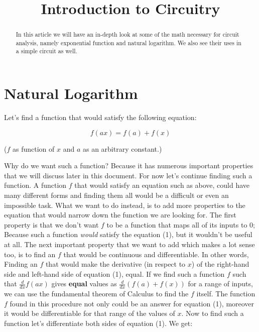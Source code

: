 \documentclass{article}
\begin{document}
	
	\title{Introduction to Circuitry}
	\author{}
	
	\maketitle
	
	\begin{abstract}
	In this article we will have an in-depth look at some of the math  necessary for circuit analysis, namely exponential function and natural logarithm. We also see their uses in a simple circuit as well.
	\end{abstract}
	
	\section{Natural Logarithm}
	Let's find a function that would satisfy the following equation:
	
	\begin{equation}
	\label{simple_equation}
	f(ax) = f(a) + f(x)
	\end{equation}
	
	($f$ as function of $x$ and $a$ as an arbitrary constant.)
	
	
	Why do we want such a function? Because it has numerous important properties that we will discuss later in this document.
	For now let's continue finding such a function. A function $f$ that would satisfy an equation such as above, could have many different forms and finding them all would be a difficult or even an impossible task. What we want to do instead, is to add more properties to the equation that would narrow down the function we are looking for. The first property is that we don't want $f$ to be a function that maps all of its inputs to $0$; Because such a function \textit{would} satisfy the equation (1), but it wouldn't be useful at all. The next important property that we want to add which makes a lot sense too, is to find an $f$ that would be continuous and differentiable. In other words, Finding an $f$ that would make the derivative (in respect to $x$) of the right-hand side and left-hand side of equation (1), equal. If we find such a function $f$ such that $\frac{d}{dx}f(ax)$ gives \textbf{equal} values as $\frac{d}{dx}(f(a) + f(x))$ for a range of inputs, we can use the fundamental theorem of Calculus to find the $f$ itself. The function $f$ found in this procedure not only could be an answer for equation (1), moreover it would be differentiable for that range of the values of $x$.	
	Now to find such a function let's differentiate both sides of equation (1). We get:
	
\end{document}
